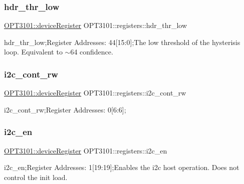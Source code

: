 \subsubsection{\texorpdfstring{hdr\+\_\+thr\+\_\+low}{hdr\_thr\_low}}
{\footnotesize\ttfamily \mbox{\hyperlink{class_o_p_t3101_1_1device_register}{O\+P\+T3101\+::device\+Register}} O\+P\+T3101\+::registers\+::hdr\+\_\+thr\+\_\+low}



hdr\+\_\+thr\+\_\+low;Register Addresses\+: 44\mbox{[}15\+:0\mbox{]};The low threshold of the hysterisis loop. Equivalent to $\sim$64 confidence. 

\mbox{\label{class_o_p_t3101_1_1registers_adbdf84416c91cc053a4b1a62ed6bea9e}} 
\subsubsection{\texorpdfstring{i2c\+\_\+cont\+\_\+rw}{i2c\_cont\_rw}}
{\footnotesize\ttfamily \mbox{\hyperlink{class_o_p_t3101_1_1device_register}{O\+P\+T3101\+::device\+Register}} O\+P\+T3101\+::registers\+::i2c\+\_\+cont\+\_\+rw}



i2c\+\_\+cont\+\_\+rw;Register Addresses\+: 0\mbox{[}6\+:6\mbox{]}; 

\mbox{\label{class_o_p_t3101_1_1registers_a0bf477ba963f16f5ff32c9f3e33b279a}} 
\subsubsection{\texorpdfstring{i2c\+\_\+en}{i2c\_en}}
{\footnotesize\ttfamily \mbox{\hyperlink{class_o_p_t3101_1_1device_register}{O\+P\+T3101\+::device\+Register}} O\+P\+T3101\+::registers\+::i2c\+\_\+en}



i2c\+\_\+en;Register Addresses\+: 1\mbox{[}19\+:19\mbox{]};Enables the i2c host operation. Does not control the init load. 

\mbox{\label{class_o_p_t3101_1_1registers_a1f94d89df7b946472aa65f09dc36f984}} 
